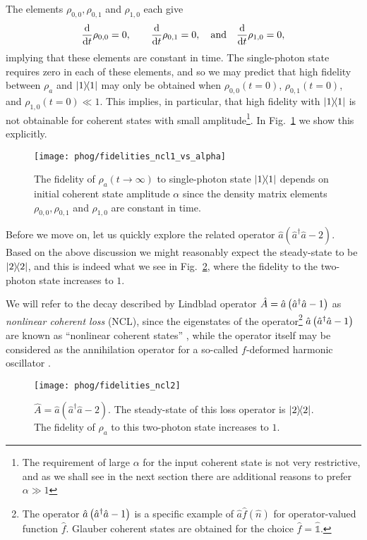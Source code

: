 \noindent The elements $\rho_{0, 0}, \rho_{0, 1}$ and $\rho_{1, 0}$ each give
\begin{equation}
\ddt \rho_{0,0} = 0, \qq{} \ddt \rho_{0, 1} = 0, \qq{and} \ddt\rho_{1, 0} = 0,
\end{equation}
implying that these elements are constant in time. The single-photon state requires zero in each of these elements, and so we may predict that high fidelity between $\rho_a$ and $\dyad{1}$ may only be obtained when $\rho_{0,0}\left(t=0\right)$, $\rho_{0, 1}\left(t=0\right)$, and $\rho_{1, 0}\left(t=0\right) \ll 1$. This implies, in particular, that high fidelity with $\dyad{1}$ is not obtainable for coherent states with small amplitude\footnote{The requirement of large $\alpha$ for the input coherent state is not very restrictive, and as we shall see in the next section there are additional reasons to prefer $\alpha \gg 1$}. In Fig.~\ref{fig:phog_fidelity_ncl_vs_alpha} we show this explicitly.

\begin{figure}[htp]
\captionsetup{width=\linewidth}
\centering
\texttt{[image: phog/fidelities\_ncl1\_vs\_alpha]}
\caption{\label{fig:phog_fidelity_ncl_vs_alpha} The fidelity of $\rho_a\left(t\rightarrow\infty\right)$ to single-photon state $\dyad{1}$ depends on initial coherent state amplitude $\alpha$ since the density matrix elements $\rho_{0, 0}, \rho_{0, 1}$ and $\rho_{1, 0}$ are constant in time. %
}
\end{figure}




Before we move on, let us quickly explore the related operator $\hat{a}\left(\hat{a}^\dagger \hat{a} -2\right)$. Based on the above discussion we might reasonably expect the steady-state to be $\dyad{2}$, and this is indeed what we see in Fig.~\ref{fig:phog_A_ncl2}, where the fidelity to the two-photon state increases to $1$. 

We will refer to the decay described by Lindblad operator $\hat{A} = \hat{a}\left(\hat{a}^\dagger \hat{a} - 1\right)$ as \emph{nonlinear coherent loss} (NCL), since the eigenstates of the operator\footnote{The operator $\hat{a}\left(\hat{a}^\dagger \hat{a} - 1\right)$ is a specific example of $\hat{a} \hat{f}\left(\hat{n}\right)$ for operator-valued function $\hat{f}$. Glauber coherent states are obtained for the choice $\hat{f} = \hat{\mathds{1}}$.}
 $\hat{a}\left(\hat{a}^\dagger \hat{a} - 1\right)$ are known as ``nonlinear coherent states'' \cite{Manko1997}, while the operator itself may be considered as the annihilation operator for a so-called $f$-deformed harmonic oscillator \cite{Filho1996}.
\begin{figure}[htp]
\captionsetup{width=\linewidth}
\centering
\texttt{[image: phog/fidelities\_ncl2]}
\caption{\label{fig:phog_A_ncl2} $\hat{A} = \hat{a}\left(\hat{a}^\dagger \hat{a} - 2\right)$. The steady-state of this loss operator is $\dyad{2}$. The fidelity of $\rho_a$ to this two-photon state increases to $1$.}
\end{figure}



